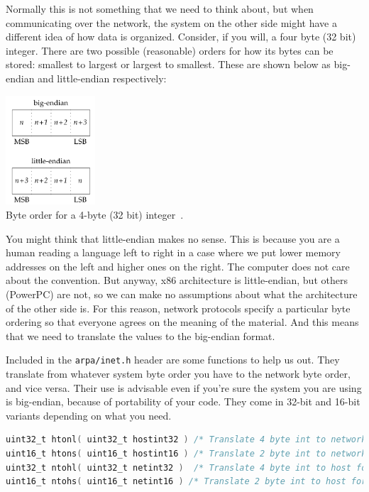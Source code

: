 \documentclass[a4paper]{report}
\begin{document}
Normally this is not something that we need to think about, but when communicating over the network, the system on the other side might have a different idea of how data is organized. Consider, if you will, a four byte (32 bit) integer. There are two possible (reasonable) orders for how its bytes can be stored: smallest to largest or largest to smallest. These are shown below as big-endian and little-endian respectively:

\begin{center}
	\includegraphics[width=0.25\textwidth]{images/endian}\\
	Byte order for a 4-byte (32 bit) integer~\cite{apunix}.
\end{center}

You might think that little-endian makes no sense. This is because you are a human reading a language left to right in a case where we put lower memory addresses on the left and higher ones on the right. The computer does not care about the convention. But anyway, x86 architecture is little-endian, but others (PowerPC) are not, so we can make no assumptions about what the architecture of the other side is. For this reason, network protocols specify a particular byte ordering so that everyone agrees on the meaning of the material. And this means that we need to translate the values to the big-endian format.

Included in the \texttt{arpa/inet.h} header are some functions to help us out. They translate from whatever system byte order you have to the network byte order, and vice versa. Their use is advisable even if you're sure the system you are using is big-endian, because of portability of your code. They come in 32-bit and 16-bit variants depending on what you need.

\begin{lstlisting}[language=C]
uint32_t htonl( uint32_t hostint32 ) /* Translate 4 byte int to network format */
uint16_t htons( uint16_t hostint16 ) /* Translate 2 byte int to network format */
uint32_t ntohl( uint32_t netint32 )  /* Translate 4 byte int to host format */
uint16_t ntohs( uint16_t netint16 ) /* Translate 2 byte int to host format */
\end{lstlisting}
\end{document}
